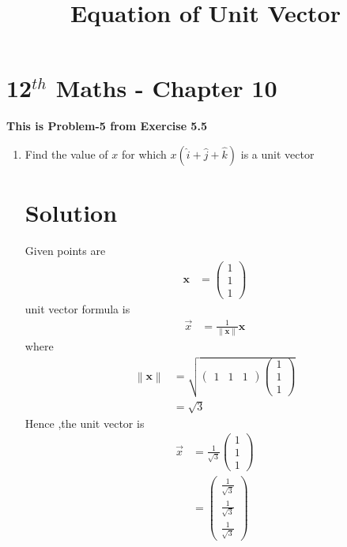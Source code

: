 \documentclass[12pt]{article}
\providecommand{\norm}[1]{\left\lVert#1\right\rVert}
\newcommand{\myvec}[1]{\ensuremath{\begin{pmatrix}#1\end{pmatrix}}}
\let\vec\mathbf
\begin{document}
\begin{center}
\title{\textbf{Equation  of Unit Vector}}
\date{\vspace{-5ex}} %
\maketitle
\end{center}
\setcounter{page}{1}
\section{12$^{th}$ Maths - Chapter 10}
\textbf{This is Problem-5 from Exercise 5.5}
\begin{enumerate}
\item Find the value of $x$ for which $x(\hat{i}+\hat{j}+\hat{k})$ is a unit vector
\section{Solution}
Given points are
\begin{align} 
\vec{x}&=\myvec{1\\1\\1}
\end{align}
unit vector formula is
\begin{align}
\overrightarrow{x} &=\frac{1}{\norm{\vec{x}}}\vec{x}
\end{align}
where
\begin{align}
\norm{\vec{x}}&=\sqrt{\myvec{1& 1& 1}\myvec{1\\1\\1}}\\
&=\sqrt{3}
\end{align}
Hence ,the unit vector is
\begin{align}
\overrightarrow{x}&=\frac{1}{\sqrt{3}}\myvec{1\\1\\1}\\
&=\myvec{\frac{1}{\sqrt{3}}\\[2pt] \frac{1}{\sqrt{3}}\\[2pt] \frac{1}{\sqrt{3}}}
\end{align}	  
\end{enumerate} 
\end{document}
